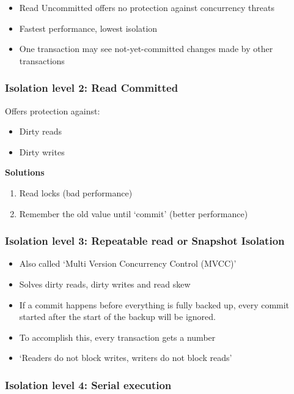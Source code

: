 \documentclass{article}
\begin{document}
\begin{itemize}
    \item Read Uncommitted offers no protection against concurrency threats
    \item Fastest performance, lowest isolation
    \item One transaction may see not-yet-committed changes made by other transactions
\end{itemize}


\subsubsection{Isolation level 2: Read Committed}

Offers protection against:

\begin{itemize}
    \item Dirty reads
    \item Dirty writes
\end{itemize}

\textbf{Solutions}

\begin{enumerate}
    \item Read locks (bad performance)
    \item Remember the old value until `commit' (better performance)
\end{enumerate}

\subsubsection{Isolation level 3: Repeatable read or Snapshot Isolation}

\begin{itemize}
    \item Also called `Multi Version Concurrency Control (MVCC)'
    \item Solves dirty reads, dirty writes and read skew
    \item If a commit happens before everything is fully backed up, every commit started after the start of the backup will be ignored.
    \item To accomplish this, every transaction gets a number
    \item `Readers do not block writes, writers do not block reads'
\end{itemize}


\subsubsection{Isolation level 4: Serial execution }
\end{document}
